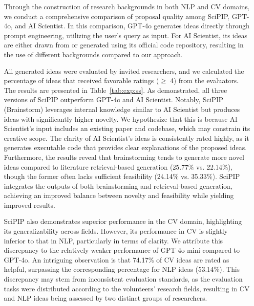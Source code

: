 \documentclass{article}
\theoremstyle{plain}
\theoremstyle{definition}
\theoremstyle{remark}
\begin{document}
Through the construction of research backgrounds in both NLP and CV domains, we conduct a comprehensive comparison of proposal quality among SciPIP, GPT-4o, and AI Scientist. In this comparison, GPT-4o generates ideas directly through prompt engineering, utilizing the user's query as input. For AI Scientist, its ideas are either drawn from or generated using its official code repository, resulting in the use of different backgrounds compared to our approach.

All generated ideas were evaluated by invited researchers, and we calculated the percentage of ideas that received favorable ratings ($\ge$ 4) from the evaluators. The results are presented in Table~\ref{tab:exp:ss}. As demonstrated, all three versions of SciPIP outperform GPT-4o and AI Scientist. Notably, SciPIP (Brainstorm) leverages internal knowledge similar to AI Scientist but produces ideas with significantly higher novelty. We hypothesize that this is because AI Scientist's input includes an existing paper and codebase, which may constrain its creative scope. The clarity of AI Scientist's ideas is consistently rated highly, as it generates executable code that provides clear explanations of the proposed ideas. Furthermore, the results reveal that brainstorming tends to generate more novel ideas compared to literature retrieval-based generation (25.77\% vs. 22.14\%), though the former often lacks sufficient feasibility (24.14\% vs. 35.33\%). SciPIP integrates the outputs of both brainstorming and retrieval-based generation, achieving an improved balance between novelty and feasibility while yielding improved results.

SciPIP also demonstrates superior performance in the CV domain, highlighting its generalizability across fields. However, its performance in CV is slightly inferior to that in NLP, particularly in terms of clarity. We attribute this discrepancy to the relatively weaker performance of GPT-4o-mini compared to GPT-4o. An intriguing observation is that 74.17\% of CV ideas are rated as helpful, surpassing the corresponding percentage for NLP ideas (53.14\%). This discrepancy may stem from inconsistent evaluation standards, as the evaluation tasks were distributed according to the volunteers' research fields, resulting in CV and NLP ideas being assessed by two distinct groups of researchers.
\vspace{-4mm}
\end{document}

